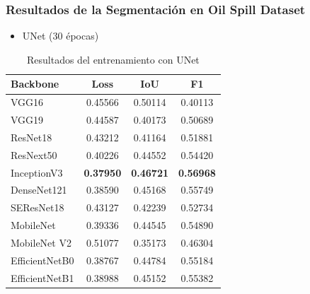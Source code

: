 \begin{frame}
\frametitle{Resultados de la Segmentación en Oil Spill Dataset}

\begin{itemize}
    \item UNet (30 épocas)
\end{itemize}    
    \begin{table}[]
        \centering
        \small
        \begin{tabular}{l|c|c|c}
            \hline
            Backbone        & Loss    & IoU     & F1 \\
            \hline
            VGG16           & 0.45566 & 0.50114 & 0.40113 \\
            VGG19           & 0.44587 & 0.40173 & 0.50689 \\
            ResNet18        & 0.43212 & 0.41164 & 0.51881 \\
            ResNext50       & 0.40226 & 0.44552 & 0.54420 \\ 
            InceptionV3     & \textbf{0.37950} & \textbf{0.46721} & \textbf{0.56968} \\
            DenseNet121     & 0.38590 & 0.45168 & 0.55749 \\
            SEResNet18      & 0.43127 & 0.42239 & 0.52734 \\
            MobileNet       & 0.39336 & 0.44545 & 0.54890 \\ 
            MobileNet V2    & 0.51077 & 0.35173 & 0.46304 \\
            EfficientNetB0  & 0.38767 & 0.44784 & 0.55184 \\
            EfficientNetB1  & 0.38988 & 0.45152 & 0.55382 \\
            \hline
        \end{tabular}
        \caption{Resultados del entrenamiento con UNet}
        \label{tab:my_label}
    \end{table}
\end{frame}


